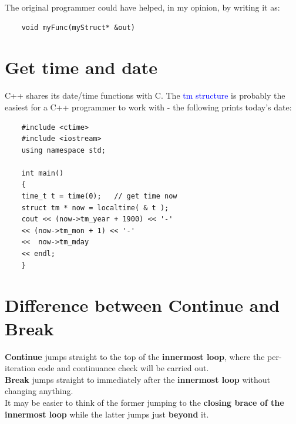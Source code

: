 	The original programmer could have helped, in my opinion, by writing it as:
	\begin{verbatim}
	void myFunc(myStruct* &out)
	\end{verbatim}
	
	\section{Get time and date}
	C++ shares its date/time functions with C. The \textcolor{blue}{tm structure} is probably the easiest for a C++ programmer to work with - the following prints today's date:
	
	\begin{verbatim}
	#include <ctime>
	#include <iostream>
	using namespace std;
	
	int main()
	{
	time_t t = time(0);   // get time now
	struct tm * now = localtime( & t );
	cout << (now->tm_year + 1900) << '-' 
	<< (now->tm_mon + 1) << '-'
	<<  now->tm_mday
	<< endl;
	}
	\end{verbatim}
	
	
	\section{Difference between Continue and Break}
	\textbf{Continue} jumps straight to the top of the \textbf{innermost loop}, where the per-iteration code and continuance check will be carried out.\\
	
	\textbf{Break} jumps straight to immediately after the \textbf{innermost loop} without changing anything.\\
	
	It may be easier to think of the former jumping to the \textbf{closing brace of the innermost loop} while the latter jumps just \textbf{beyond} it.
	
